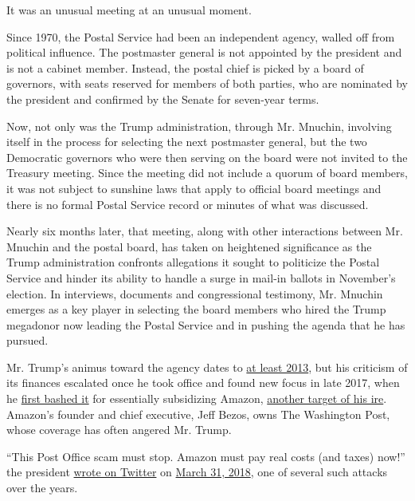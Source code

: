 It was an unusual meeting at an unusual moment.

Since 1970, the Postal Service had been an independent agency, walled
off from political influence. The postmaster general is not appointed by
the president and is not a cabinet member. Instead, the postal chief is
picked by a board of governors, with seats reserved for members of both
parties, who are nominated by the president and confirmed by the Senate
for seven-year terms.

Now, not only was the Trump administration, through Mr. Mnuchin,
involving itself in the process for selecting the next postmaster
general, but the two Democratic governors who were then serving on the
board were not invited to the Treasury meeting. Since the meeting did
not include a quorum of board members, it was not subject to sunshine
laws that apply to official board meetings and there is no formal Postal
Service record or minutes of what was discussed.

Nearly six months later, that meeting, along with other interactions
between Mr. Mnuchin and the postal board, has taken on heightened
significance as the Trump administration confronts allegations it sought
to politicize the Postal Service and hinder its ability to handle a
surge in mail-in ballots in November's election. In interviews,
documents and congressional testimony, Mr. Mnuchin emerges as a key
player in selecting the board members who hired the Trump megadonor now
leading the Postal Service and in pushing the agenda that he has
pursued.

Mr. Trump's animus toward the agency dates to
\href{https://twitter.com/realdonaldtrump/status/299212012121112578}{at
least 2013}, but his criticism of its finances escalated once he took
office and found new focus in late 2017, when he
\href{https://twitter.com/realDonaldTrump/status/946728546633953285}{first
bashed it} for essentially subsidizing Amazon,
\href{https://www.nytimes3xbfgragh.onion/2018/03/29/us/politics/trump-amazon-post-office-fact-check.html}{another
target of his ire}. Amazon's founder and chief executive, Jeff Bezos,
owns The Washington Post, whose coverage has often angered Mr. Trump.

``This Post Office scam must stop. Amazon must pay real costs (and
taxes) now!'' the president
\href{https://twitter.com/realdonaldtrump/status/980065419632566272}{wrote
on Twitter} on
\href{https://twitter.com/realDonaldTrump/status/980063581592047617}{March
31, 2018}, one of several such attacks over the years.

